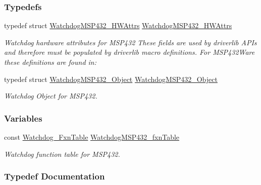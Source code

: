 \subsubsection*{Typedefs}
\begin{DoxyCompactItemize}
\item 
typedef struct \hyperlink{struct_watchdog_m_s_p432___h_w_attrs}{Watchdog\+M\+S\+P432\+\_\+\+H\+W\+Attrs} \hyperlink{_watchdog_m_s_p432_8h_aa84a69b45dcb9d42a077d1bdfad211da}{Watchdog\+M\+S\+P432\+\_\+\+H\+W\+Attrs}
\begin{DoxyCompactList}\small\item\em Watchdog hardware attributes for M\+S\+P432 These fields are used by driverlib A\+P\+Is and therefore must be populated by driverlib macro definitions. For M\+S\+P432\+Ware these definitions are found in\+: \end{DoxyCompactList}\item 
typedef struct \hyperlink{struct_watchdog_m_s_p432___object}{Watchdog\+M\+S\+P432\+\_\+\+Object} \hyperlink{_watchdog_m_s_p432_8h_adda7dce88065097cb75156432dbfbede}{Watchdog\+M\+S\+P432\+\_\+\+Object}
\begin{DoxyCompactList}\small\item\em Watchdog Object for M\+S\+P432. \end{DoxyCompactList}\end{DoxyCompactItemize}
\subsubsection*{Variables}
\begin{DoxyCompactItemize}
\item 
const \hyperlink{struct_watchdog___fxn_table}{Watchdog\+\_\+\+Fxn\+Table} \hyperlink{_watchdog_m_s_p432_8h_a7ccdf8f14ade7da8949b94ef66ec8a4f}{Watchdog\+M\+S\+P432\+\_\+fxn\+Table}
\begin{DoxyCompactList}\small\item\em Watchdog function table for M\+S\+P432. \end{DoxyCompactList}\end{DoxyCompactItemize}


\subsubsection{Typedef Documentation}
